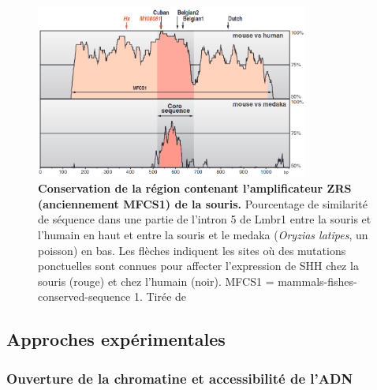 \begin{figure}[h]
    \centering
    \includegraphics[width=0.8\textwidth, page=1] {figures/introduction/fig8.png}
    \caption[Conservation de la région contenant l'\gls{amplificateur} \acrshort{ZRS} (anciennement MFCS1) de la souris.]{
    \textbf{Conservation de la région contenant l'\gls{amplificateur} \acrshort{ZRS} (anciennement MFCS1) de la souris.}
    Pourcentage de similarité de séquence dans une partie de l'intron 5 de Lmbr1 entre la souris et l'humain en haut et entre la souris et le medaka (\textit{Oryzias latipes}, un poisson) en bas. Les flèches indiquent les sites où des mutations ponctuelles sont connues pour affecter l'expression de \acrshort{SHH} chez la souris (rouge) et chez l'humain (noir).
    MFCS1 = mammals-fishes-conserved-sequence 1.
    Tirée de \citep{sagai_elimination_2005}\\
    }
    \label{fig:Fig8}
\end{figure}

\subsection{Approches expérimentales}
\label{subsec:approch-expe}

\subsubsection{Ouverture de la chromatine et accessibilité de l’ADN}
\label{subsubsec:ouverture-chroma}

